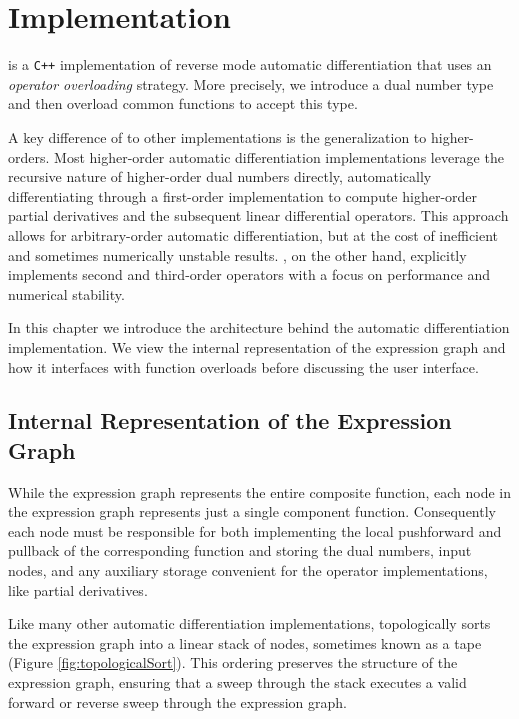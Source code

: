 \chapter{Implementation}

\nomad is a \verb|C++| implementation of reverse mode automatic
differentiation that uses an \textit{operator overloading} strategy.
More precisely, we introduce a dual number type and then overload
common functions to accept this type.

A key difference of \nomad to other implementations is the generalization
to higher-orders.  Most higher-order automatic differentiation
implementations leverage the recursive nature of higher-order dual
numbers directly, automatically differentiating through a first-order
implementation to compute higher-order partial derivatives and
the subsequent linear differential operators.  This approach allows for
arbitrary-order automatic differentiation, but at the cost of inefficient and 
sometimes numerically unstable results.  \nomad,
on the other hand, explicitly implements second and third-order operators
with a focus on performance and numerical stability.

In this chapter we introduce the architecture behind the \nomad automatic 
differentiation implementation.  We view the internal representation of the 
expression graph and how it interfaces with function overloads before
discussing the user interface.

\section{Internal Representation of the Expression Graph}

While the expression graph represents the entire composite function, each
node in the expression graph represents just a single component function.  
Consequently each node must be responsible for both implementing the 
local pushforward and pullback of the corresponding function and storing 
the dual numbers, input nodes, and any auxiliary storage convenient for 
the operator implementations, like partial derivatives.
 
Like many other automatic differentiation implementations, \nomad
topologically sorts the expression graph into a linear stack of nodes, 
sometimes known as a tape (Figure \ref{fig:topologicalSort}).  This ordering 
preserves the structure of the expression graph, ensuring that a sweep 
through the stack executes a valid forward or reverse sweep through the 
expression graph.

